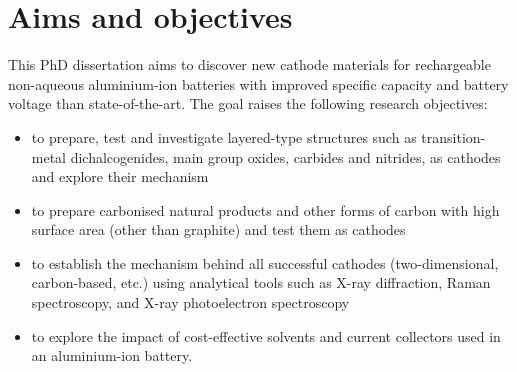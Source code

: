 \section*{\centering Aims and objectives}
This PhD dissertation aims to discover new cathode materials for rechargeable non-aqueous aluminium-ion batteries with improved specific capacity and battery voltage than state-of-the-art. The goal raises the following research objectives:
\begin{itemize}
    \item to prepare, test and investigate layered-type structures such as transition-metal dichalcogenides, main group oxides, carbides and nitrides, as cathodes and explore their mechanism
    \item to prepare carbonised natural products and other forms of carbon with high surface area (other than graphite) and test them as cathodes 
    \item to establish the mechanism behind all successful cathodes (two-dimensional, carbon-based, etc.) using analytical tools such as X-ray diffraction, Raman spectroscopy, and X-ray photoelectron spectroscopy
    \item to explore the impact of cost-effective solvents and current collectors used in an aluminium-ion battery. 
    
\end{itemize}
\newpage
\newpage

